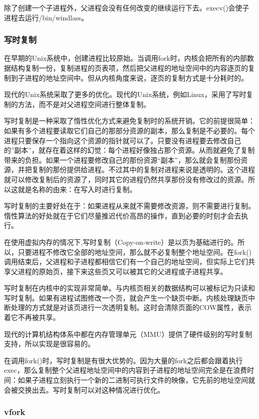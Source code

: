 除了创建一个子进程外，父进程会没有任何改变的继续运行下去。execv()会使子进程去运行/bin/windlass。

\subsubsection{写时复制}

在早期的Unix系统中，创建进程比较原始。当调用fork时，内核会把所有的内部数据结构复制一份，复制进程的页表项，然后把父进程的地址空间中的内容逐页的复制到子进程的地址空间中。但从内核角度来说，逐页的复制方式是十分耗时的。

现代的Unix系统采取了更多的优化。现代的Unix系统，例如Linux，采用了写时复制的方法，而不是对父进程空间进行整体复制。

写时复制是一种采取了惰性优化方式来避免复制时的系统开销。它的前提很简单：如果有多个进程要读取它们自己的那部分资源的副本，那么复制是不必要的。每个进程只要保存一个指向这个资源的指针就可以了。只要没有进程要去修改自己的''副本''，就存在着这样的幻觉：每个进程好像独占那个资源。从而就避免了复制带来的负担。如果一个进程要修改自己的那份资源“副本”，那么就会复制那份资源，并把复制的那份提供给进程。不过其中的复制对进程来说是透明的。这个进程就可以修改复制后的资源了，同时其它的进程仍然共享那份没有修改过的资源。所以这就是名称的由来：在写入时进行复制。

写时复制的主要好处在于：如果进程从来就不需要修改资源，则不需要进行复制。惰性算法的好处就在于它们尽量推迟代价高昂的操作，直到必要的时刻才会去执行。

在使用虚拟内存的情况下,写时复制（Copy-on-write）是以页为基础进行的。所以，只要进程不修改它全部的地址空间，那么就不必复制整个地址空间。在fork()调用结束后，父进程和子进程都相信它们有一个自己的地址空间，但实际上它们共享父进程的原始页，接下来这些页又可以被其它的父进程或子进程共享。

写时复制在内核中的实现非常简单。与内核页相关的数据结构可以被标记为只读和写时复制。如果有进程试图修改一个页，就会产生一个缺页中断。内核处理缺页中断处理的方式就是对该页进行一次透明复制。这时会清除页面的COW属性，表示着它不再被共享。

现代的计算机结构体系中都在内存管理单元（MMU）提供了硬件级别的写时复制支持，所以实现是很容易的。

在调用fork()时，写时复制是有很大优势的。因为大量的fork之后都会跟着执行exec，那么复制整个父进程地址空间中的内容到子进程的地址空间完全是在浪费时间：如果子进程立刻执行一个新的二进制可执行文件的映像，它先前的地址空间就会被交换出去。写时复制可以对这种情况进行优化。

\subsubsection{vfork}

